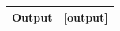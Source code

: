 \documentclass[authoryear,preprint,review,12pt]{elsarticle}
\begin{document}
\begin{table}[htbp]
{\begin{tabular}{ll}
\textbf{Output} & {[}output{]}                                                                                                                                                                                                                                                                                                                                                                                                                                                                                                                                                                                                                                                                                                                                                                                                                                                                                                                                                                                                                                                                                                                                                                                                                                                          \\ \bottomrule
\end{tabular}}
\end{table}
\end{document}
